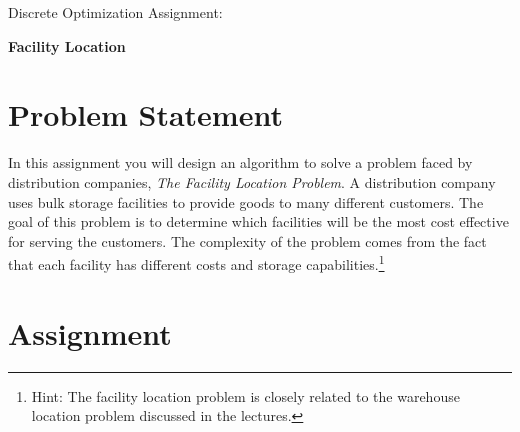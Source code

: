 \documentclass[11pt]{article}
\begin{document}
\huge
\noindent
{Discrete Optimization Assignment:}
\vspace{0.25cm}

\noindent
{\bf Facility Location}
\normalsize


\section{Problem Statement}

In this assignment you will design an algorithm to solve a problem faced by distribution companies, {\em The Facility Location Problem}. A distribution company uses bulk storage facilities to provide goods to many different customers.  The goal of this problem is to determine which facilities will be the most cost effective for serving the customers.  The complexity of the problem comes from the fact that each facility has different costs and storage capabilities.\footnote{Hint: The facility location problem is closely related to the warehouse location problem discussed in the lectures.} 


\section{Assignment}
\end{document}
